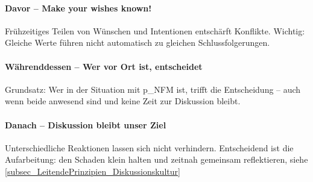 \paragraph{Davor – Make your wishes known!}  
Frühzeitiges Teilen von Wünschen und Intentionen entschärft Konflikte. Wichtig: Gleiche Werte führen nicht automatisch zu gleichen Schlussfolgerungen.

\paragraph{Währenddessen – Wer vor Ort ist, entscheidet}  
Grundsatz: Wer in der Situation mit \gls{p_NFM} ist, trifft die Entscheidung – auch wenn beide anwesend sind und keine Zeit zur Diskussion bleibt.

\paragraph{Danach – Diskussion bleibt unser Ziel}  
Unterschiedliche Reaktionen lassen sich nicht verhindern. Entscheidend ist die Aufarbeitung: den Schaden klein halten und zeitnah gemeinsam reflektieren, siehe \ref{subsec_LeitendePrinzipien_Diskussionskultur}